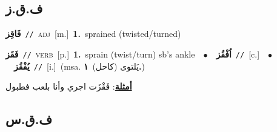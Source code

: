 \documentclass[10pt,a4paper,twoside]{article} %
\begin{document}
\begin{multicols}{2}
\vspace{-3mm}
\subsection*{\color{blue}\foreignlanguage{arabic}{ف.ق.ز}\color{blue}{}} 

{\setlength\topsep{0pt}\textbf{\foreignlanguage{arabic}{فَاقِز}}\ {\color{gray}\texttt{//}\color{black}}\ \textsc{adj}\ [m.]\ \textbf{1.}~sprained (twisted/turned)\ } \vspace{2mm}

{\setlength\topsep{0pt}\textbf{\foreignlanguage{arabic}{فَقَز}}\ {\color{gray}\texttt{//}\color{black}}\ \textsc{verb}\ [p.]\ \textbf{1.}~sprain (twist/turn) sb's ankle\ \ $\bullet$\ \ \setlength\topsep{0pt}\textbf{\foreignlanguage{arabic}{اُفْقُز}}\ {\color{gray}\texttt{//}\color{black}}\ [c.]\ \ $\bullet$\ \ \setlength\topsep{0pt}\textbf{\foreignlanguage{arabic}{يُفْقُز}}\ {\color{gray}\texttt{//}\color{black}}\ [i.]\ \color{gray}(msa. \foreignlanguage{arabic}{يَلتوى (كاحل)}~\foreignlanguage{arabic}{\textbf{١.}})\color{black}\  \begin{flushright}\color{gray}\foreignlanguage{arabic}{\textbf{\underline{\foreignlanguage{arabic}{أمثلة}}}: فَقْزَت اجري وأنا بلعب فطبول}\end{flushright}\color{black}} \vspace{2mm}

\vspace{-3mm}
\subsection*{\color{blue}\foreignlanguage{arabic}{ف.ق.س}\color{blue}{}} 


\end{multicols}
\end{document}
